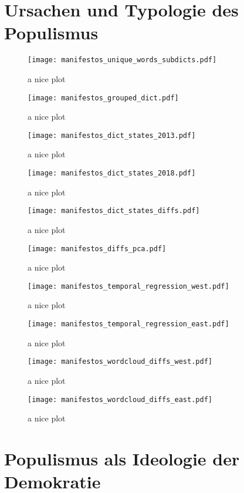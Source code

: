 \documentclass[a4paper]{scrreprt}
\begin{document}
\section{Ursachen und Typologie des Populismus}
\begin{figure}
    \centering
    \texttt{[image: manifestos\_unique\_words\_subdicts.pdf]}
    \caption{a nice plot}
\end{figure}
\begin{figure}
    \centering
    \texttt{[image: manifestos\_grouped\_dict.pdf]}
    \caption{a nice plot}
\end{figure}
\begin{figure}
    \centering
    \texttt{[image: manifestos\_dict\_states\_2013.pdf]}
    \caption{a nice plot}
\end{figure}
\begin{figure}
    \centering
    \texttt{[image: manifestos\_dict\_states\_2018.pdf]}
    \caption{a nice plot}
\end{figure}
\begin{figure}
    \centering
    \texttt{[image: manifestos\_dict\_states\_diffs.pdf]}
    \caption{a nice plot}
\end{figure}
\begin{figure}
    \centering
    \texttt{[image: manifestos\_diffs\_pca.pdf]}
    \caption{a nice plot}
\end{figure}
\begin{figure}
    \centering
    \texttt{[image: manifestos\_temporal\_regression\_west.pdf]}
    \caption{a nice plot}
\end{figure}
\begin{figure}
    \centering
    \texttt{[image: manifestos\_temporal\_regression\_east.pdf]}
    \caption{a nice plot}
\end{figure}
\begin{figure}
    \centering
    \texttt{[image: manifestos\_wordcloud\_diffs\_west.pdf]}
    \caption{a nice plot}
\end{figure}
\begin{figure}
    \centering
    \texttt{[image: manifestos\_wordcloud\_diffs\_east.pdf]}
    \caption{a nice plot}
\end{figure}

\section{Populismus als Ideologie der Demokratie}
\end{document}
